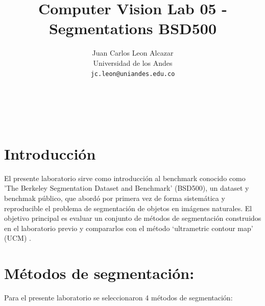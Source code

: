 \documentclass[10pt,twocolumn,letterpaper]{article}
\begin{document}
\title{Computer Vision Lab 05 -Segmentations BSD500}

\author{Juan Carlos Leon Alcazar\\
Universidad de los Andes\\
{\tt\small jc.leon@uniandes.edu.co}
\and
\\
\\
\\
{\tt\small }
}

\maketitle



\section{Introducción}
El presente laboratorio sirve como introducción al benchmark conocido como 'The Berkeley Segmentation Dataset and Benchmark' (BSD500), un dataset y benchmak público, que abordó por primera vez de forma sistemática y reproducible el problema de segmentación de objetos en imágenes naturales. El objetivo principal es evaluar un conjunto de métodos de segmentación construidos en el laboratorio previo y compararlos con el método ‘ultrametric contour map’ (UCM) \cite{Arbelaez2009}.

\section{Métodos de segmentación:}
Para  el presente laboratorio se seleccionaron 4 métodos de segmentación:
\end{document}
